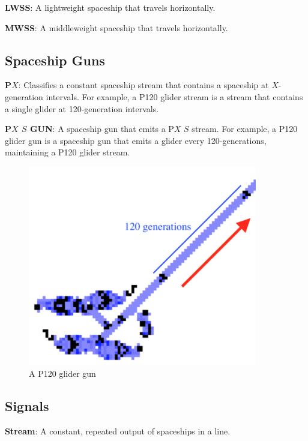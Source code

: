 \documentclass{article}
\begin{document}
\noindent\textbf{LWSS}: A lightweight spaceship that travels horizontally.

\vspace{1em}

\noindent\textbf{MWSS}: A middleweight spaceship that travels horizontally.

\vspace{1em}
\subsection{Spaceship Guns}
\noindent\textbf{P$X$}: Classifies a constant spaceship stream that contains a spaceship at $X$-generation intervals. For example, a P120 glider stream is a stream that contains a single glider at 120-generation intervals.

\vspace{1em}

\noindent\textbf{P$X$ $S$ GUN}: A spaceship gun that emits a P$X$ $S$ stream. For example, a P120 glider gun is a spaceship gun that emits a glider every 120-generations, maintaining a P120 glider stream.

\vspace{1em}

\begin{figure}[h]
\centering
\includegraphics[width=10cm,keepaspectratio]{images/P120-GUN.png}
\captionsetup{labelformat=empty} \caption{A P120 glider gun}
\end{figure}
\subsection{Signals}
\noindent\textbf{Stream}: A constant, repeated output of spaceships in a line.
\end{document}
